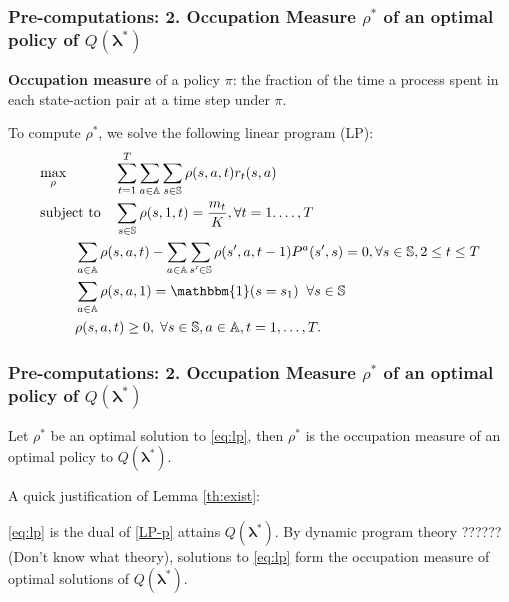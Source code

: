 \documentclass{beamer}
\newcommand{\lambdav}{\pmb{\lambda}}
\newcommand{\ind}[1]{\mathbbm{1}(#1)}
\newcommand{\substates}{\mathbb{S}}
\newcommand{\substate}{s}
\newcommand{\subactions}{\mathbb{A}}
\newcommand{\subpr}{P}
\begin{document}
\begin{frame}
\frametitle{Pre-computations: 2. Occupation Measure $\rho^*$ of an optimal policy of $Q(\lambdav^*)$}
\textbf{Occupation measure} of a policy $\pi$: the fraction of the time a process spent in each state-action pair at a time step under $\pi$. 

\vspace{0.5cm}
To compute $\rho^*$, we solve the following linear program (LP):
\small
\begin{equation}\label{eq:lp}
\begin{aligned}
& \underset{\rho}{\text{max}}
& & \sum_{t=1}^{T}\sum_{a\in\subactions}\sum_{s\in\substates}\rho(s,a,t)r_t(s,a) \\
& \text{subject to}
& & \sum_{s\in\substates}\rho(s,1,t)=\frac{m_t}{K}, \forall t=1.\ldots,T\\
& & & \hspace{-1cm}\sum_{a\in \subactions}\rho(s,a,t) - \sum_{a\in\subactions}\sum_{s'\in\substates}\rho(s',a,t-1)\subpr^{a}(s',s)=0, \forall \substate\in\substates,2\leq t\leq T\\
& & & \hspace{-1cm}\sum_{a\in\subactions}\rho(s,a,1)=\ind{s=s_1} \;\;\forall s\in\substates\\
& & & \hspace{-1cm}\rho(s,a,t)\geq 0, \; \forall s\in\substates,a\in\subactions,t=1,\ldots,T.
\end{aligned}
\end{equation}
\end{frame}

\begin{frame}
\frametitle{Pre-computations: 2. Occupation Measure $\rho^*$ of an optimal policy of $Q(\lambdav^*)$}
\begin{Lemma}\label{th:exist}
Let $\rho^*$ be an optimal solution to \eqref{eq:lp},
then $\rho^*$ is the occupation measure of an optimal policy to $Q(\lambdav^*)$.
\end{Lemma}
\vspace{0.5cm}
A quick justification of Lemma \ref{th:exist}: 

\eqref{eq:lp} is the dual of \eqref{LP-p} attains $Q(\lambdav^*)$. By dynamic program theory ??????(Don't know what theory), solutions to \eqref{eq:lp} form the occupation measure of optimal solutions of $Q(\lambdav^*)$.

\end{frame}
\end{document}
